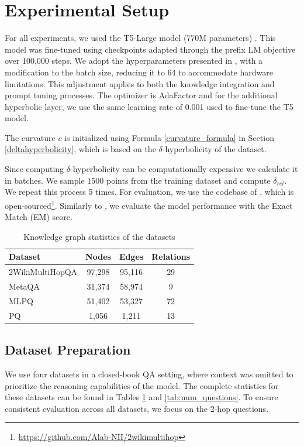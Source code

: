 \documentclass[11pt]{article}
\begin{document}
\section{Experimental Setup}

For all experiments, we used the T5-Large model (770M parameters) \cite{raffel2023exploringlimitstransferlearning}. This model was fine-tuned using checkpoints adapted through the prefix LM objective \cite{liu2018generating} over 100,000 steps. We adopt the hyperparameters presented in \citet{misra2023triggeringmultihopreasoningquestion}, with a modification to the batch size, reducing it to 64 to accommodate hardware limitations. This adjustment applies to both the knowledge integration and prompt tuning processes. The optimizer is AdaFactor \cite{shazeer2018adafactor} and for the additional hyperbolic layer, we use the same learning rate of 0.001 used to fine-tune the T5 model. 

The curvature $c$ is initialized using Formula \ref{curvature_formula} in Section \ref{deltahyperbolicity}, which is based on the $\delta$-hyperbolicity of the dataset. 

Since computing $\delta$-hyperbolicity can be computationally expensive we calculate it in batches. We sample $1500$ points from the training dataset and compute $\delta_{rel}$. We repeat this process 5 times. For evaluation, we use the codebase of \citet{ho2020multihopqa}, which is open-sourced\footnote{\href{https://github.com/Alab-NII/2wikimultihop}{https://github.com/Alab-NII/2wikimultihop}}. Similarly to \citet{misra2023triggeringmultihopreasoningquestion}, we evaluate the model performance with the Exact Match (EM) score. 

\begin{table}[t]
\setlength{\tabcolsep}{3.5pt}
\small
\centering
\begin{tabularx}{\columnwidth}{Xccc}
\toprule
Dataset & Nodes & Edges & Relations  \\ 
\midrule
2Wiki\-MultiHopQA & 97,298 & 95,116 & 29 \\
MetaQA & 31,374 & 58,974 & 9 \\
MLPQ & 51,402 & 53,327 & 72 \\
PQ & 1,056 & 1,211 & 13 \\ 
\bottomrule
\end{tabularx}
\caption{Knowledge graph statistics of the datasets}
\label{tab:knowledge_graph_statistics}
\end{table}

\subsection{Dataset Preparation} \label{sec:datasets}
We use four datasets in a closed-book QA setting, where context was omitted to prioritize the reasoning capabilities of the model. The complete statistics for these datasets can be found in Tables \ref{tab:knowledge_graph_statistics} and \ref{tab:num_questions}. To ensure consistent evaluation across all datasets, we focus on the 2-hop questions. 
\end{document}
